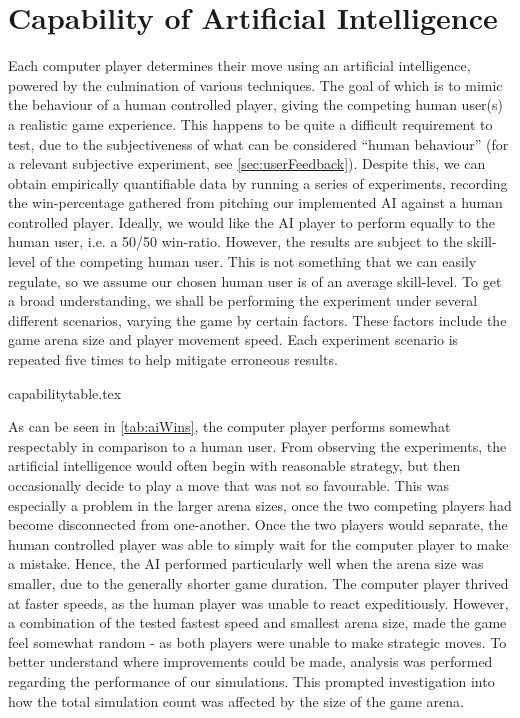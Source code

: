 \documentclass{standalone}
\begin{document}
	\section{Capability of Artificial Intelligence} \label{sec:aiCapabilities}
		Each computer player determines their move using an artificial intelligence, powered by the culmination of various techniques. The goal of which is to mimic the behaviour of a human controlled player, giving the competing human user(s) a realistic game experience. This happens to be quite a difficult requirement to test, due to the subjectiveness of what can be considered \enquote{human behaviour} (for a relevant subjective experiment, see \autoref{sec:userFeedback}). Despite this, we can obtain empirically quantifiable data by running a series of experiments, recording the win-percentage gathered from pitching our implemented AI against a human controlled player. Ideally, we would like the AI player to perform equally to the human user, i.e. a 50/50 win-ratio. However, the results are subject to the skill-level of the competing human user. This is not something that we can easily regulate, so we assume our chosen human user is of an average skill-level. To get a broad understanding, we shall be performing the experiment under several different scenarios, varying the game by certain factors. These factors include the game arena size and player movement speed. Each experiment scenario is repeated five times to help mitigate erroneous results.

		{capabilitytable.tex}

		As can be seen in \autoref{tab:aiWins}, the computer player performs somewhat respectably in comparison to a human user. From observing the experiments, the artificial intelligence would often begin with reasonable strategy, but then occasionally decide to play a move that was not so favourable. This was especially a problem in the larger arena sizes, once the two competing players had become disconnected from one-another. Once the two players would separate, the human controlled player was able to simply wait for the computer player to make a mistake. Hence, the AI performed particularly well when the arena size was smaller, due to the generally shorter game duration. The computer player thrived at faster speeds, as the human player was unable to react expeditiously. However, a combination of the tested fastest speed and smallest arena size, made the game feel somewhat random - as both players were unable to make strategic moves. To better understand where improvements could be made, analysis was performed regarding the performance of our simulations. This prompted investigation into how the total simulation count was affected by the size of the game arena.
\end{document}
